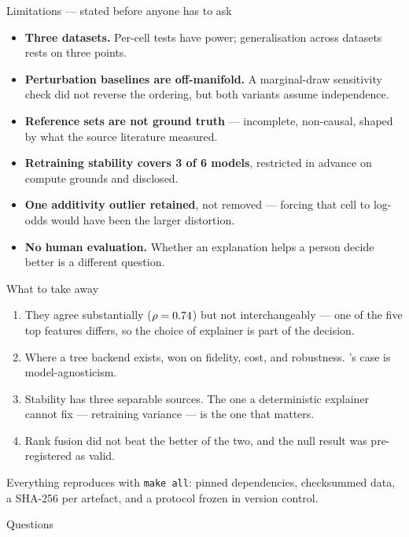 \begin{frame}{Limitations --- stated before anyone has to ask}
\begin{itemize}\setlength\itemsep{0.55em}
  \item \textbf{Three datasets.} Per-cell tests have power; generalisation across
    datasets rests on three points.
  \item \textbf{Perturbation baselines are off-manifold.} A marginal-draw sensitivity
    check did not reverse the ordering, but both variants assume independence.
  \item \textbf{Reference sets are not ground truth} --- incomplete, non-causal,
    shaped by what the source literature measured.
  \item \textbf{Retraining stability covers 3 of 6 models}, restricted in advance on
    compute grounds and disclosed.
  \item \textbf{One additivity outlier retained}, not removed --- forcing that cell to
    log-odds would have been the larger distortion.
  \item \textbf{No human evaluation.} Whether an explanation helps a person decide
    better is a different question.
\end{itemize}
\end{frame}

\begin{frame}{What to take away}
\begin{enumerate}\setlength\itemsep{0.6em}
  \item They agree substantially ($\rho = 0.74{}$) but not interchangeably --- one
    of the five top features differs, so the choice of explainer is part of the decision.
  \item Where a tree backend exists, \shap{} won on fidelity, cost, and robustness.
    \lime{}'s case is model-agnosticism.
  \item Stability has three separable sources. The one a deterministic explainer cannot
    fix --- retraining variance --- is the one that matters.
  \item Rank fusion did not beat the better of the two, and the null result was
    pre-registered as valid.
\end{enumerate}
\vfill
{\small Everything reproduces with \texttt{make all}: pinned dependencies, checksummed
data, a SHA-256 per artefact, and a protocol frozen in version control.}
\end{frame}

\begin{frame}[standout]
Questions
\end{frame}
